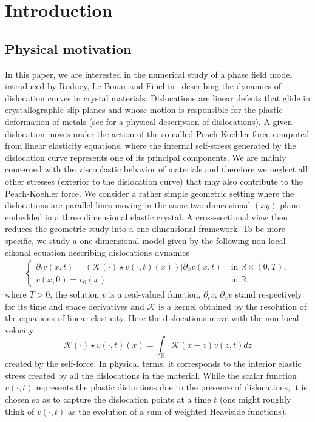 \documentclass[11pt]{amsart}
\newcommand{\K}{\mathcal{K}}
\newcommand{\R}{\mathbb{R}}
\begin{document}
\tableofcontents


\section{Introduction}
\subsection{Physical motivation}
In this paper, we are interested in the numerical study of a phase field model introduced by Rodney, Le Bouar and Finel in~\cite{22} describing the dynamics of dislocation curves in crystal materials. Dislocations are linear defects that glide in crystallographic slip planes and  whose motion is responsible for the plastic deformation of metals (see \cite{19} for a physical description of dislocations). A given dislocation moves under the action of the so-called Peach-Koehler force computed from linear elasticity equations, where the internal self-stress generated by the dislocation curve represents one of its principal components. We are mainly concerned with the viscoplastic behavior of materials and therefore we neglect all other stresses (exterior to the dislocation curve) that may also contribute to the Peach-Koehler force. We consider a rather simple geometric setting where the dislocations are parallel lines moving in the same two-dimensional $(xy)$ plane embedded in a three dimensional elastic crystal. A cross-sectional view then reduces the geometric study into a one-dimensional framework. To be more specific, we study a one-dimensional model given by the following non-local eikonal equation describing dislocations dynamics
\begin{align}\label{non periodic equation0}
    \begin{cases}
  \partial_t v(x,t) = \left( \K(\cdot) \star v(\cdot,t)(x)\right)
  \left|\partial_xv(x,t)\right|& \mbox{in } \mathbb{R} \times (0, T), \\
  v(x,0) = v_0(x) & \mbox{in } \mathbb{R},
\end{cases}
\end{align}
where $T>0$, the solution $v$ is a real-valued function,  $\partial_t v$, $\partial_x v$ stand respectively for its time and space derivatives and $\K$ is a kernel obtained by the resolution of the equations of linear elasticity. Here the dislocations move with the non-local velocity
$$\K(\cdot) \star v(\cdot,t)(x) = \int_{\R} \K(x-z)v(z,t)dz$$
created by the self-force. In physical terms, it corresponds to the interior elastic stress created by all the dislocations in the material. While the scalar function $v(\cdot,t)$ represents the plastic distortions due to the presence of dislocations, it is chosen so as to capture the dislocation points at a time $t$ (one might roughly think of $v(\cdot,t)$ as the evolution of a sum of weighted Heaviside functions).  
\end{document}
